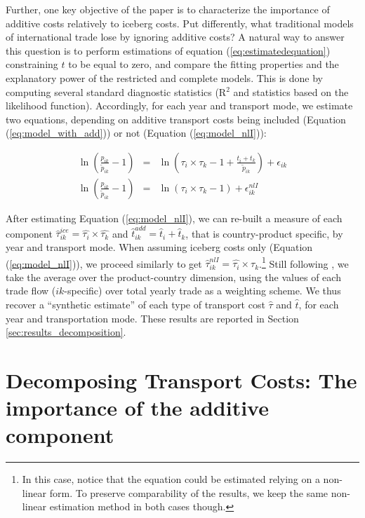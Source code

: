 \documentclass[a4paper,11pt]{article}
\begin{document}
Further, one key objective of the paper is to characterize the importance of additive costs relatively to iceberg costs. Put differently, what traditional models of international trade lose by ignoring additive costs? A natural way to answer this question is to perform estimations of equation (\ref{eq:estimatedequation}) constraining $t$ to be equal to zero, and compare the fitting properties and the explanatory power of the restricted and complete models. This is done by computing several standard diagnostic statistics (R$^{2}$ and statistics based on the likelihood function). Accordingly, for each year and transport mode, we estimate two equations, depending on additive transport costs being included (Equation (\ref{eq:model_with_add})) or not (Equation (\ref{eq:model_nlI})):

\begin{eqnarray}
\ln\left(\frac{p_{ik}}{\widetilde{p}_{ik}}-1 \right)&=& \ln \left(\tau_{i} \times \tau_{k}-1 +\frac{t_{i} + t_{k}}{\widetilde{p}_{ik}}\right) + \epsilon_{ik} \label{eq:model_with_add} \\
\ln\left(\frac{p_{ik}}{\widetilde{p}_{ik}}-1 \right)&=& \ln \left(\tau_{i} \times \tau_{k}-1 \right) + \epsilon^{nlI}_{ik} \label{eq:model_nlI}
\end{eqnarray}

After estimating Equation (\ref{eq:model_nlI}), we can re-built a measure of each component $\widehat{\tau}^{ice}_{ik} = \widehat{\tau_{i}} \times \widehat{\tau_{k}}$ and $\widehat{t}^{add}_{ik} = \widehat{t}_{i} + \widehat{t}_{k}$, that is country-product specific, by year and transport mode. When assuming iceberg costs only (Equation (\ref{eq:model_nlI})), we proceed similarly to get $\widehat{\tau}^{nlI}_{ik} = \widehat{\tau_{i}} \times \widehat{\tau_{k}}$.\footnote{In this case, notice that the equation could be estimated relying on a non-linear form. To preserve comparability of the results, we keep the same non-linear estimation method in both cases though.} Still following \citet{Irrazabal_2015}, we take the average over the product-country dimension, using the values of each trade flow ($ik$-specific) over total yearly trade as a weighting scheme. We thus recover a ``synthetic estimate'' of each type of transport cost $\widehat{\tau}$ and $\widehat{t}$, for each year and transportation mode. These results are reported in Section \ref{sec:results_decomposition}.


\section{Decomposing Transport Costs: The importance of the additive component \label{sec:results_decomposition}}
\end{document}
